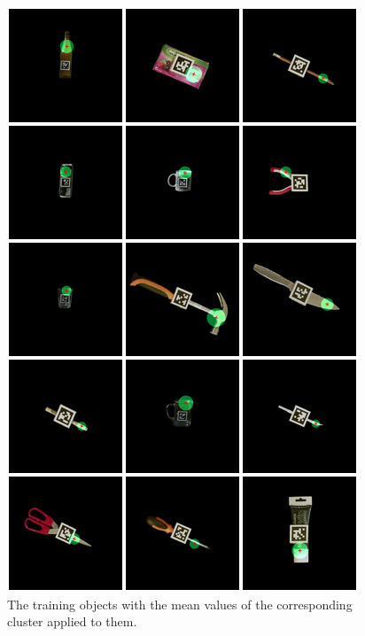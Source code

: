 \begin{figure}
	\centering
	\includegraphics[width=\textwidth]{img/results/objects.jpg}
	\caption{The training objects with the mean values of the corresponding cluster applied to them.}
	\label{fig:results_objects}
\end{figure}

